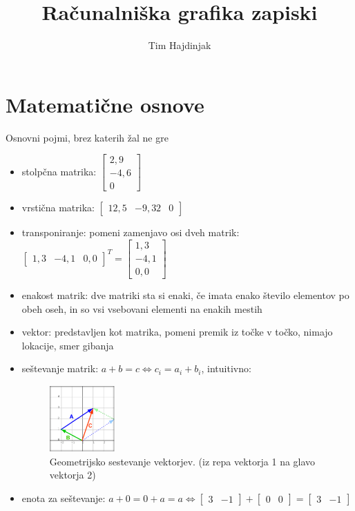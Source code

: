 \documentclass{article}
\title{Računalniška grafika zapiski}
\author{Tim Hajdinjak}
\begin{document}
\maketitle

\section{Matematične osnove}

Osnovni pojmi, brez katerih žal ne gre

\begin{itemize}
\item stolpčna matrika: $\begin{bmatrix} 2,9 \\ -4,6 \\ 0 \end{bmatrix}$
\item vrstična matrika:  $\begin{bmatrix} 12,5 & -9,32 & 0 \end{bmatrix}$
\item transponiranje: pomeni zamenjavo osi dveh matrik: $\begin{bmatrix} 1,3 & -4,1 & 0,0 \end{bmatrix}^T = \begin{bmatrix} 1,3 \\ -4,1 \\ 0,0 \end{bmatrix}$
\item enakost matrik: dve matriki sta si enaki, če imata enako število elementov po obeh oseh, in so vsi vsebovani elementi na enakih mestih
\item vektor: predstavljen kot matrika, pomeni premik iz točke v točko, nimajo lokacije, smer gibanja
\item seštevanje matrik: $a + b = c \iff c_i = a_i + b_i$, intuitivno: 
\begin{figure}[H]
\centering
\includegraphics[width=25mm]{src/sestevanje_vektorjev.png}
\caption{Geometrijsko sestevanje vektorjev. (iz repa vektorja 1 na glavo vektorja 2)}
\end{figure}
\item enota za seštevanje: $a + 0 = 0 + a = a \iff \begin{bmatrix} 3 & -1 \end{bmatrix} + \begin{bmatrix} 0 & 0 \end{bmatrix} = \begin{bmatrix} 3 & -1 \end{bmatrix}$

\end{itemize}
\end{document}
